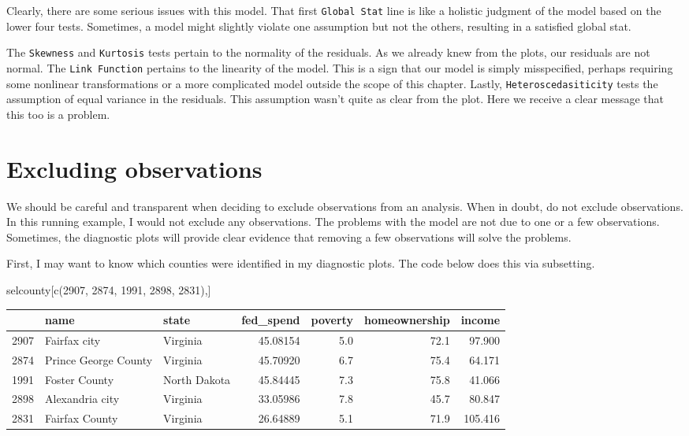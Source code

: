 \documentclass[
]{book}
\makeatletter
\newenvironment{Shaded}{\begin{snugshade}}{\end{snugshade}}
\newcommand{\DecValTok}[1]{\textcolor[rgb]{0.06,0.06,0.06}{#1}}
\newcommand{\FunctionTok}[1]{\textcolor[rgb]{0,0,0}{#1}}
\newcommand{\NormalTok}[1]{#1}
\newenvironment{kframe}{%
\medskip{}
\setlength{\fboxsep}{.8em}
 \def\at@end@of@kframe{}%
 \ifinner\ifhmode%
  \def\at@end@of@kframe{\end{minipage}}%
  \begin{minipage}{\columnwidth}%
 \fi\fi%
 \def\FrameCommand##1{\hskip\@totalleftmargin \hskip-\fboxsep
 \colorbox{shadecolor}{##1}\hskip-\fboxsep
     \hskip-\linewidth \hskip-\@totalleftmargin \hskip\columnwidth}%
 \MakeFramed {\advance\hsize-\width
   \@totalleftmargin\z@ \linewidth\hsize
   \@setminipage}}%
 {\par\unskip\endMakeFramed%
 \at@end@of@kframe}
\renewenvironment{Shaded}{\begin{kframe}}{\end{kframe}}
\makeatother
\begin{document}
Clearly, there are some serious issues with this model. That first \texttt{Global\ Stat} line is like a holistic judgment of the model based on the lower four tests. Sometimes, a model might slightly violate one assumption but not the others, resulting in a satisfied global stat.

The \texttt{Skewness} and \texttt{Kurtosis} tests pertain to the normality of the residuals. As we already knew from the plots, our residuals are not normal. The \texttt{Link\ Function} pertains to the linearity of the model. This is a sign that our model is simply misspecified, perhaps requiring some nonlinear transformations or a more complicated model outside the scope of this chapter. Lastly, \texttt{Heteroscedasiticity} tests the assumption of equal variance in the residuals. This assumption wasn't quite as clear from the plot. Here we receive a clear message that this too is a problem.

\hypertarget{excluding-observations}{%
\section{Excluding observations}\label{excluding-observations}}

We should be careful and transparent when deciding to exclude observations from an analysis. When in doubt, do not exclude observations. In this running example, I would not exclude any observations. The problems with the model are not due to one or a few observations. Sometimes, the diagnostic plots will provide clear evidence that removing a few observations will solve the problems.

First, I may want to know which counties were identified in my diagnostic plots. The code below does this via subsetting.

\begin{Shaded}
\begin{Highlighting}[]
\NormalTok{selcounty[}\FunctionTok{c}\NormalTok{(}\DecValTok{2907}\NormalTok{, }\DecValTok{2874}\NormalTok{, }\DecValTok{1991}\NormalTok{, }\DecValTok{2898}\NormalTok{, }\DecValTok{2831}\NormalTok{),]}
\end{Highlighting}
\end{Shaded}

\begin{tabular}{l|l|l|r|r|r|r}
\hline
  & name & state & fed\_spend & poverty & homeownership & income\\
\hline
2907 & Fairfax city & Virginia & 45.08154 & 5.0 & 72.1 & 97.900\\
\hline
2874 & Prince George County & Virginia & 45.70920 & 6.7 & 75.4 & 64.171\\
\hline
1991 & Foster County & North Dakota & 45.84445 & 7.3 & 75.8 & 41.066\\
\hline
2898 & Alexandria city & Virginia & 33.05986 & 7.8 & 45.7 & 80.847\\
\hline
2831 & Fairfax County & Virginia & 26.64889 & 5.1 & 71.9 & 105.416\\
\hline
\end{tabular}
\end{document}
